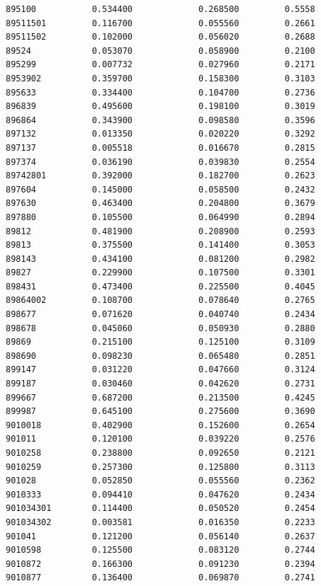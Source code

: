 \documentclass[
  letterpaper,
  DIV=11,
  numbers=noendperiod]{scrartcl}
\begin{document}
\begin{verbatim}
895100           0.534400             0.268500         0.5558
89511501         0.116700             0.055560         0.2661
89511502         0.102000             0.056020         0.2688
89524            0.053070             0.058900         0.2100
895299           0.007732             0.027960         0.2171
8953902          0.359700             0.158300         0.3103
895633           0.334400             0.104700         0.2736
896839           0.495600             0.198100         0.3019
896864           0.343900             0.098580         0.3596
897132           0.013350             0.020220         0.3292
897137           0.005518             0.016670         0.2815
897374           0.036190             0.039830         0.2554
89742801         0.392000             0.182700         0.2623
897604           0.145000             0.058500         0.2432
897630           0.463400             0.204800         0.3679
897880           0.105500             0.064990         0.2894
89812            0.481900             0.208900         0.2593
89813            0.375500             0.141400         0.3053
898143           0.434100             0.081200         0.2982
89827            0.229900             0.107500         0.3301
898431           0.473400             0.225500         0.4045
89864002         0.108700             0.078640         0.2765
898677           0.071620             0.040740         0.2434
898678           0.045060             0.050930         0.2880
89869            0.215100             0.125100         0.3109
898690           0.098230             0.065480         0.2851
899147           0.031220             0.047660         0.3124
899187           0.030460             0.042620         0.2731
899667           0.687200             0.213500         0.4245
899987           0.645100             0.275600         0.3690
9010018          0.402900             0.152600         0.2654
901011           0.120100             0.039220         0.2576
9010258          0.238800             0.092650         0.2121
9010259          0.257300             0.125800         0.3113
901028           0.052850             0.055560         0.2362
9010333          0.094410             0.047620         0.2434
901034301        0.114400             0.050520         0.2454
901034302        0.003581             0.016350         0.2233
901041           0.121200             0.056140         0.2637
9010598          0.125500             0.083120         0.2744
9010872          0.166300             0.091230         0.2394
9010877          0.136400             0.069870         0.2741

\end{verbatim}
\end{document}
